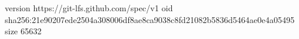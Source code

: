 version https://git-lfs.github.com/spec/v1
oid sha256:21e90207ede2504a308006df8ae8ca9038c8fd21082b5836d5464ae0e4a05495
size 65632

